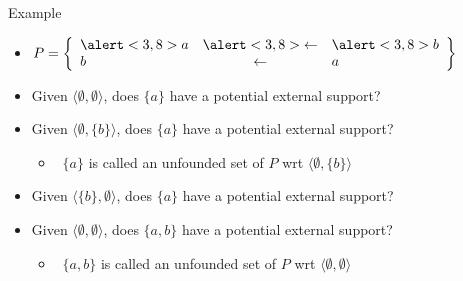 \begin{frame}{Example}
  \bigskip
  \begin{itemize}
  \item<1->
    \(
    P
    =
    \left\{
      \begin{array}{lcl}
        \alert<3,8>{a} &\alert<3,8>{\leftarrow} & \alert<3,8>{b} \\
                    b  &            \leftarrow  &             a
      \end{array}
    \right\}
    \)
    \bigskip\bigskip
  \item<2-11> Given $\langle\emptyset,\emptyset\rangle$, does $\{a\}$   have a potential external support?~
    \smallskip
  \item<5-> Given $\langle\emptyset,\{b\}    \rangle$, does $\{a\}$   have a potential external support?~
    \smallskip
    \begin{itemize}\normalsize
    \item<only@13> []\itarrow\ $\{a\}$ is called an \alert{unfounded set} of $P$ wrt $\langle\emptyset,\{b\}\rangle$
    \end{itemize}
  \item<7-11> Given $\langle\{b\},    \emptyset\rangle$, does $\{a\}$   have a potential external support?~
    \medskip
  \item<10-> Given $\langle\emptyset,\emptyset\rangle$, does $\{a,b\}$ have a potential external support?~
    \smallskip
    \begin{itemize}\normalsize
    \item<only@13> []\itarrow\ $\{a,b\}$ is called an \alert{unfounded set} of $P$ wrt $\langle\emptyset,\emptyset\rangle$
    \end{itemize}
  \end{itemize}
\end{frame}
